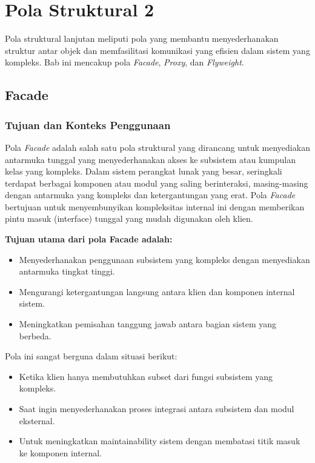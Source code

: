 \chapter{Pola Struktural 2}

Pola struktural lanjutan meliputi pola yang membantu menyederhanakan struktur antar objek dan memfasilitasi komunikasi yang efisien dalam sistem yang kompleks. Bab ini mencakup pola \textit{Facade}, \textit{Proxy}, dan \textit{Flyweight}.

\section{Facade}

\subsection{Tujuan dan Konteks Penggunaan}

Pola \textit{Facade} adalah salah satu pola struktural yang dirancang untuk menyediakan antarmuka tunggal yang menyederhanakan akses ke subsistem atau kumpulan kelas yang kompleks. Dalam sistem perangkat lunak yang besar, seringkali terdapat berbagai komponen atau modul yang saling berinteraksi, masing-masing dengan antarmuka yang kompleks dan ketergantungan yang erat. Pola \textit{Facade} bertujuan untuk menyembunyikan kompleksitas internal ini dengan memberikan pintu masuk (interface) tunggal yang mudah digunakan oleh klien.

\textbf{Tujuan utama dari pola Facade adalah:}
\begin{itemize}
	\item Menyederhanakan penggunaan subsistem yang kompleks dengan menyediakan antarmuka tingkat tinggi.
	\item Mengurangi ketergantungan langsung antara klien dan komponen internal sistem.
	\item Meningkatkan pemisahan tanggung jawab antara bagian sistem yang berbeda.
\end{itemize}

Pola ini sangat berguna dalam situasi berikut:
\begin{itemize}
	\item Ketika klien hanya membutuhkan subset dari fungsi subsistem yang kompleks.
	\item Saat ingin menyederhanakan proses integrasi antara subsistem dan modul eksternal.
	\item Untuk meningkatkan maintainability sistem dengan membatasi titik masuk ke komponen internal.
\end{itemize}

